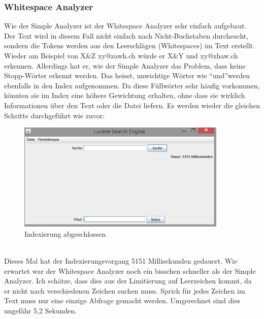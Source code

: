 \documentclass[12pt,a4paper,ngerman]{report}
\begin{document}
\subsubsection{Whitespace Analyzer}
Wie der Simple Analyzer ist der Whitespace Analyzer sehr einfach aufgebaut. Der Text wird in diesem Fall nicht einfach nach Nicht-Buchstaben durchsucht, sondern die Tokens werden aus den Leerschlägen (Whitespaces) im Text erstellt. Wieder am Beispiel von X\&Z xy@zawh.ch würde er X\&Y und xy@zhaw.ch erkennen. Allerdings hat er, wie der Simple Analyzer das Problem, dass keine Stopp-Wörter erkennt werden. Das heisst, unwichtige Wörter wie \textquotedblleft und\textquotedblright werden ebenfalls in den Index aufgenommen. Da diese Füllwörter sehr häufig vorkommen, könnten sie im Index eine höhere Gewichtung erhalten, ohne dass sie wirklich Informationen über den Text oder die Datei liefern.
\newpage
Es werden wieder die gleichen Schritte durchgeführt wie zuvor:
\begin{figure}[h!]
\centering
\includegraphics[width=10cm]{img/whitespace-analyzer-index.png}
\caption{Indexierung abgeschlossen\protect\footnotemark}
\end{figure}
\\
Dieses Mal hat der Indexierungsvorgang 5151 Millisekunden gedauert. Wie erwartet war der Whitespace Analyzer noch ein bisschen schneller als der Simple Analyzer. Ich schätze, dass dies aus der Limitierung auf Leerzeichen kommt, da er nicht nach verschiedenen Zeichen suchen muss. Sprich für jedes Zeichen im Text muss nur eine einzige Abfrage gemacht werden. Umgerechnet sind dies ungefähr 5,2 Sekunden.
\end{document}
